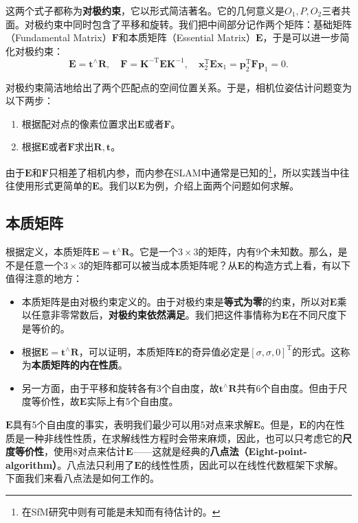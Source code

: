 这两个式子都称为\textbf{对极约束}，它以形式简洁著名。它的几何意义是$O_1, P, O_2$三者共面。对极约束中同时包含了平移和旋转。我们把中间部分记作两个矩阵：基础矩阵（Fundamental Matrix）$\bm{F}$和本质矩阵（Essential Matrix）$\bm{E}$，于是可以进一步简化对极约束：
\begin{equation}
\bm{E} = \bm{t}^ \wedge \bm{R}, \quad \bm{F} = \bm{K}^{ -\mathrm{T}} \bm{E} {\bm{K}^{ - 1}}, \quad \bm{x}_2^\mathrm{T} \bm{E} {\bm{x}_1} = \bm{p}_2^\mathrm{T} \bm{F} {\bm{p}_1} = 0.
\end{equation}

对极约束简洁地给出了两个匹配点的空间位置关系。于是，相机位姿估计问题变为以下两步：

\begin{enumerate}
	\item 根据配对点的像素位置求出$\bm{E}$或者$\bm{F}$。
	\item 根据$\bm{E}$或者$\bm{F}$求出$\bm{R}, \bm{t}$。
\end{enumerate}

由于$\bm{E}$和$\bm{F}$只相差了相机内参，而内参在SLAM中通常是已知的\footnote{在SfM研究中则有可能是未知而有待估计的。}，所以实践当中往往使用形式更简单的$\bm{E}$。我们以$\bm{E}$为例，介绍上面两个问题如何求解。

\subsection{本质矩阵}
根据定义，本质矩阵$\bm{E} = \bm{t}^\wedge \bm{R}$。它是一个$3\times 3$的矩阵，内有9个未知数。那么，是不是任意一个$3 \times 3$的矩阵都可以被当成本质矩阵呢？从$\bm{E}$的构造方式上看，有以下值得注意的地方：

\begin{itemize}
	\item 本质矩阵是由对极约束定义的。由于对极约束是\textbf{等式为零}的约束，所以对$\bm{E}$乘以任意非零常数后，\textbf{对极约束依然满足}。我们把这件事情称为$\bm{E}$在不同尺度下是等价的。
	\item 根据$\bm{E} = \bm{t}^ \wedge \bm{R}$，可以证明\textsuperscript{\cite{Hartley2003}}，本质矩阵$\bm{E}$的奇异值必定是$[\sigma, \sigma, 0]^\mathrm{T}$的形式。这称为\textbf{本质矩阵的内在性质}。
\clearpage
	\item 另一方面，由于平移和旋转各有3个自由度，故$\bm{t}^\wedge \bm{R}$共有6个自由度。但由于尺度等价性，故$\bm{E}$实际上有5个自由度。
\end{itemize}

$\bm{E}$具有5个自由度的事实，表明我们最少可以用5对点来求解$\bm{E}$。但是，$\bm{E}$的内在性质是一种非线性性质，在求解线性方程时会带来麻烦，因此，也可以只考虑它的\textbf{尺度等价性}，使用8对点来估计$\bm{E}$——这就是经典的\textbf{八点法（Eight-point-algorithm）}\textsuperscript{\cite{Hartley1997, Longuet-Higgins1987}}。八点法只利用了$\bm{E}$的线性性质，因此可以在线性代数框架下求解。下面我们来看八点法是如何工作的。

